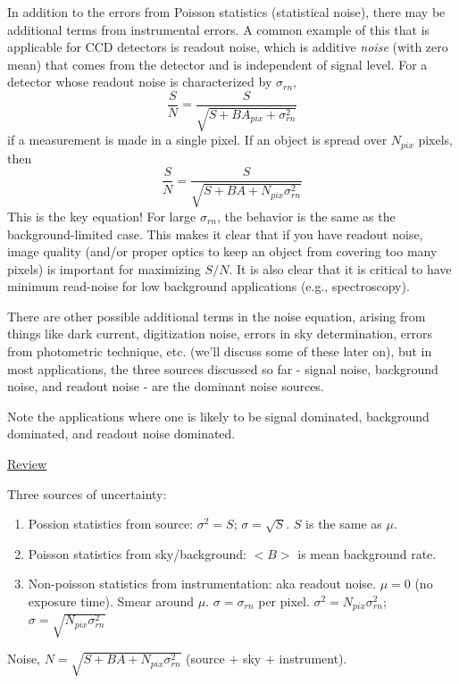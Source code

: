 \documentclass[12pt]{article}
\begin{document}
In addition to the errors from Poisson statistics (statistical noise),
there may be additional terms from instrumental errors. A common
example of this that is applicable for CCD detectors is readout noise,
which is additive \emph{noise} (with zero mean) that comes from the detector
and is independent of signal level. For a detector whose readout noise
is characterized by $\sigma_{rn}$,
$$ \frac{S}{N} = \frac{S}{\sqrt{S+BA_{pix}+\sigma^{2}_{rn}}} $$
if a measurement is made in a single pixel. If an object is spread
over $N_{pix}$ pixels, then
$$ \boxed{
 \frac{S}{N} = \frac{S}{\sqrt{S+BA+N_{pix}\sigma^{2}_{rn}}}
 } $$
\textcolor{myBlue}{This is the key equation!}
For large $\sigma_{rn}$, the behavior is the same as the
background-limited case. This makes it clear that if you have readout
noise, image quality (and/or proper optics to keep an object from
covering too many pixels) is important for maximizing $S/N$. It is
also clear that it is critical to have minimum read-noise for low
background applications (e.g., spectroscopy).

There are other possible additional terms in the noise equation,
arising from things like dark current, digitization noise, errors in
sky determination, errors from photometric technique, etc. (we'll
discuss some of these later on), but in most applications, the three
sources discussed so far - signal noise, background noise, and readout
noise - are the dominant noise sources.

Note the applications where one is likely to be signal dominated,
background dominated, and readout noise dominated.

\textcolor{myBlue}{\large \underline{Review}}\normalsize

Three sources of uncertainty:
\begin{enumerate}
    \item Possion statistics from source: $\sigma^{2} = S$;
        $\sigma = \sqrt{S}$. $S$ is the same as $\mu$.
    \item Poisson statistics from sky/background:
        $<B>$ is mean background rate.
    \item Non-poisson statistics from instrumentation:
        aka readout noise. $\mu=0$ (no exposure time).
        Smear around $\mu$. $\sigma = \sigma_{rn}$ per pixel.
        $\sigma^{2} = N_{pix}\sigma_{rn}^{2}$;
        $\sigma = \sqrt{N_{pix}\sigma_{rn}^{2}}$
\end{enumerate}
Noise, $N = \sqrt{S+BA+N_{pix}\sigma_{rn}^{2}}$
(source + sky + instrument).
\end{document}
